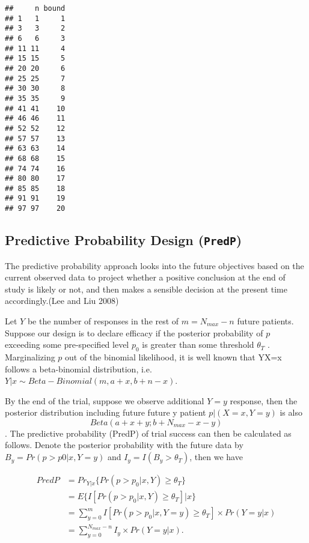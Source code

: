 \documentclass[]{article}
\begin{document}
\begin{verbatim}
##     n bound
## 1   1     1
## 3   3     2
## 6   6     3
## 11 11     4
## 15 15     5
## 20 20     6
## 25 25     7
## 30 30     8
## 35 35     9
## 41 41    10
## 46 46    11
## 52 52    12
## 57 57    13
## 63 63    14
## 68 68    15
## 74 74    16
## 80 80    17
## 85 85    18
## 91 91    19
## 97 97    20
\end{verbatim}

\subsection{\texorpdfstring{Predictive Probability Design
(\texttt{PredP})}{Predictive Probability Design (PredP)}}\label{predictive-probability-design-predp}

The predictive probability approach looks into the future objectives
based on the current observed data to project whether a positive
conclusion at the end of study is likely or not, and then makes a
sensible decision at the present time accordingly.(Lee and Liu 2008)

Let \(Y\) be the number of responses in the rest of \(m = N_{max} -n\)
future patients. Suppose our design is to declare efficacy if the
posterior probability of \(p\) exceeding some pre-specified level
\(p_0\) is greater than some threshold \(\theta_T\) . Marginalizing
\(p\) out of the binomial likelihood, it is well known that
Y\textbar{}X=x follows a beta-binomial distribution, i.e.
\(Y|x \sim Beta-Binomial(m, a + x, b + n - x)\).

By the end of the trial, suppose we observe additional \(Y = y\)
response, then the posterior distribution including future future y
patient \(p|(X = x, Y = y)\) is also \[Beta(a+x+y; b+N_{max}-x-y)\]. The
predictive probability (PredP) of trial success can then be calculated
as follows. Denote the posterior probability with the future data by
\(B_y = Pr(p > p0 | x, Y = y)\) and \(I_y = I(B_y > \theta_T )\), then
we have

\[ \begin{aligned} PredP & = Pr_{Y|x} \{Pr(p>p_0|x, Y) \ge \theta_T \} \\
        & = E \{ I[Pr(p>p_0|x, Y) \ge \theta_T] \Big| x  \}\\
        & = \sum\limits_{y=0}^{m}  I[Pr(p>p_0|x, Y=y) \ge \theta_T] \times Pr(Y=y|x)\\
        & = \sum\limits_{y=0}^{N_{max} -n}  I_y \times Pr(Y=y|x). \label{predp}
        \end{aligned} \]
\end{document}
